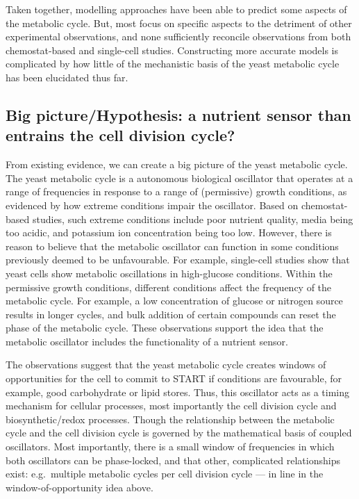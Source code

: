 
Taken together, modelling approaches have been able to predict some aspects of the metabolic cycle.
But, most focus on specific aspects to the detriment of other experimental observations, and none sufficiently reconcile observations from both chemostat-based and single-cell studies.
Constructing more accurate models is complicated by how little of the mechanistic basis of the yeast metabolic cycle has been elucidated thus far.

\subsection[Big picture/Hypothesis]{Big picture/Hypothesis: a nutrient sensor than entrains the cell division cycle?}
\label{subsec:intro-ymc-hypothesis}

From existing evidence, we can create a big picture of the yeast metabolic cycle.
The yeast metabolic cycle is a autonomous biological oscillator that operates at a range of frequencies in response to a range of (permissive) growth conditions, as evidenced by how extreme conditions impair the oscillator.
Based on chemostat-based studies, such extreme conditions include poor nutrient quality, media being too acidic, and potassium ion concentration being too low.
However, there is reason to believe that the metabolic oscillator can function in some conditions previously deemed to be unfavourable.
For example, single-cell studies show that yeast cells show metabolic oscillations in high-glucose conditions.
Within the permissive growth conditions, different conditions affect the frequency of the metabolic cycle.
For example, a low concentration of glucose or nitrogen source results in longer cycles, and bulk addition of certain compounds can reset the phase of the metabolic cycle.
These observations support the idea that the metabolic oscillator includes the functionality of a nutrient sensor.

The observations suggest that the yeast metabolic cycle creates windows of opportunities for the cell to commit to START if conditions are favourable, for example, good carbohydrate or lipid stores.
Thus, this oscillator acts as a timing mechanism for cellular processes, most importantly the cell division cycle and biosynthetic/redox processes.
Though the relationship between the metabolic cycle and the cell division cycle is governed by the mathematical basis of coupled oscillators.
Most importantly, there is a small window of frequencies in which both oscillators can be phase-locked, and that other, complicated relationships exist: e.g.\ multiple metabolic cycles per cell division cycle --- in line in the window-of-opportunity idea above.

